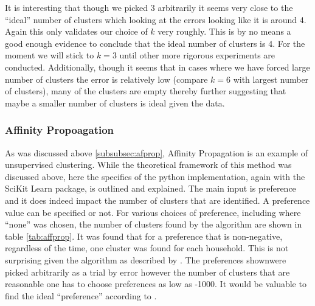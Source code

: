 \documentclass[a4paper]{article}
\begin{document}
It is interesting that though we picked 3 arbitrarily it seems very close to the ``ideal'' number of clusters which looking at the errors looking like it is around 4. Again this only validates our choice of $k$ very roughly. This is by no means a good enough evidence to conclude that the ideal number of clusters is 4. For the moment we will stick to $k=3$ until other more rigorous experiments are conducted. %
Additionally, though it seems that in cases where we have forced large number of clusters the error is relatively low (compare $k=6$ with largest number of clusters), many of the clusters are empty thereby further suggesting that maybe a smaller number of clusters is ideal given the data.


\subsubsection{Affinity Propoagation} \label{subsubsec:affprop_res}
As was discussed above \ref{subsubsec:afprop}, Affinity Propagation is an example of unsupervised clustering. While the theoretical framework of this method was discussed above, here the specifics of the python implementation, again with the SciKit Learn package, is outlined and explained. The main input is preference and it does indeed impact the number of clusters that are identified. A preference value can be specified or not. For various choices of preference, including where ``none'' was chosen, the number of clusters found by the algorithm are shown in table \ref{tab:affprop}. It was found that for a preference that is non-negative, regardless of the time, one cluster was found for each household. This is not surprising given the algorithm as described by \cite{frey07}. The preferences shownwere picked arbitrarily as a trial by error however the number of clusters that are reasonable one has to choose preferences as low as -1000. It would be valuable to find the ideal ``preference'' according to \cite{frey07}. 
\end{document}
